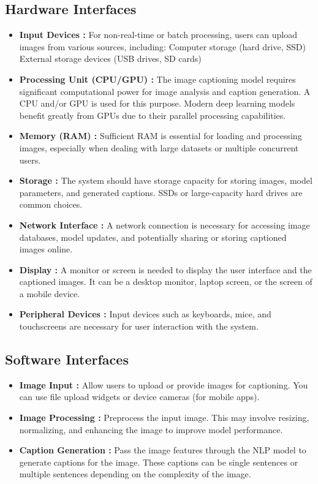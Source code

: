 \documentclass[oneside,a4paper,12pt]{report}
\begin{document}
\subsection{Hardware Interfaces}
\begin{itemize}
\item \textbf{Input Devices :} For non-real-time or batch processing, users can upload images from various sources, including:
Computer storage (hard drive, SSD)
External storage devices (USB drives, SD cards)
\item \textbf{Processing Unit (CPU/GPU) :} The image captioning model requires significant computational power for image analysis and caption generation. A CPU and/or GPU is used for this purpose. Modern deep learning models benefit greatly from GPUs due to their parallel processing capabilities.
\item \textbf{Memory (RAM) : }Sufficient RAM is essential for loading and processing images, especially when dealing with large datasets or multiple concurrent users.
\item \textbf{Storage :} The system should have storage capacity for storing images, model parameters, and generated captions. SSDs or large-capacity hard drives are common choices.
\item \textbf{Network Interface :} A network connection is necessary for accessing image databases, model updates, and potentially sharing or storing captioned images online.
\item \textbf{Display :} A monitor or screen is needed to display the user interface and the captioned images. It can be a desktop monitor, laptop screen, or the screen of a mobile device.
\item \textbf{Peripheral Devices :} Input devices such as keyboards, mice, and touchscreens are necessary for user interaction with the system.


\end{itemize}
\subsection{Software Interfaces}
\begin{itemize}
\item \textbf{Image Input :}
Allow users to upload or provide images for captioning. You can use file upload widgets or device cameras (for mobile apps).
\item \textbf{Image Processing :}
Preprocess the input image. This may involve resizing, normalizing, and enhancing the image to improve model performance.
\item \textbf{Caption Generation :}
Pass the image features through the NLP model to generate captions for the image. These captions can be single sentences or multiple sentences depending on the complexity of the image.


\end{itemize}
\end{document}
